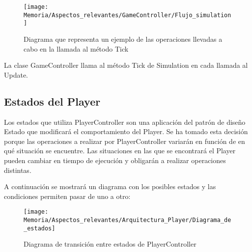 \begin{figure}[h]
\centering
\texttt{[image: Memoria/Aspectos\_relevantes/GameController/Flujo\_simulation]}
\caption{Diagrama que representa un ejemplo de las operaciones llevadas a cabo en la llamada al método Tick}
\end{figure}
\clearpage

La clase GameController llama al método Tick de Simulation en cada llamada al Update.

\subsection{Estados del Player}
Los estados que utiliza PlayerController son una aplicación del patrón de diseño Estado que modificará el comportamiento del Player. Se ha tomado esta decisión porque las operaciones a realizar por PlayerController variarán en función de en qué situación se encuentre. Las situaciones en las que se encontrará el Player pueden cambiar en tiempo de ejecución y obligarán a realizar operaciones distintas.

A continuación se mostrará un diagrama con los posibles estados y las condiciones permiten pasar de uno a otro:

\clearpage
\begin{figure}[h]
\centering
\texttt{[image: Memoria/Aspectos\_relevantes/Arquitectura\_Player/Diagrama\_de\_estados]}
\caption{Diagrama de transición entre estados de PlayerController}
\end{figure}

